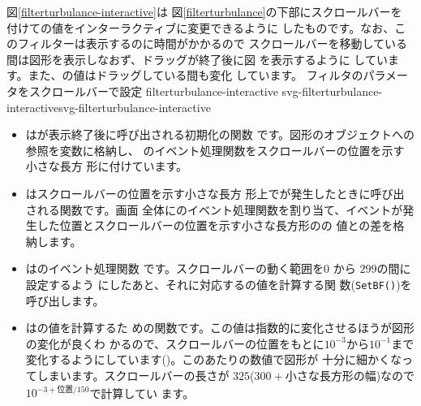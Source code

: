 \ifSeminor
\else
図\ref{filterturbulance-interactive}は
図\ref{filterturbulance}の下部にスクロールバーを
付けての値をインターラクティブに変更できるように
したものです。なお、このフィルターは表示するのに時間がかかるので
スクロールバーを移動している間は図形を表示しなおず、ドラッグが終了後に図
を表示するように
しています。また、の値はドラッグしている間も変化
しています。
{フィルタのパラメータをスクロールバーで設定}
{filterturbulance-interactive}
{svg-filterturbulance-interactive}{svg-filterturbulance-interactive}
\begin{itemize}
 \item {}は\SVG が表示終了後に呼び出される初期化の関数
       です。図形のオブジェクトへの参照を変数に格納し、
       のイベント処理関数をスクロールバーの位置を示す小さな長方
       形に付けています。
 \item {}はスクロールバーの位置を示す小さな長方
       形上でが発生したときに呼び出される関数です。画面
       全体にのイベント処理関数を割り当て、イベントが発
       生した位置とスクロールバーの位置を示す小さな長方形のの
       値との差を格納します。
 \item {}はのイベント処理関数
       です。スクロールバーの動く範囲を$0$ から $299$の間に設定するよう
       にしたあと、それに対応するの値を計算する関
       数(\texttt{SetBF()})を呼び出します。
 \item {}はの値を計算するた
       めの関数です。この値は指数的に変化させるほうが図形の変化が良くわ
       かるので、スクロールバーの位置をもとに$10^{-3}$から$10^{-1}$まで
       変化するようにしています()。このあたりの数値で図形が
       十分に細かくなってしまいます。スクロールバーの長さが
       $325$($300+小さな長方形の幅$)なので$10^{-3+位置/150}$で計算してい
       ます。


\end{itemize}
